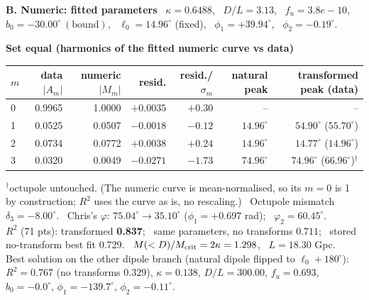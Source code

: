 \documentclass[10pt]{article}
\begin{document}
\medskip\textbf{B. Numeric: fitted parameters} \ $\kappa=0.6488$, \ $D/L=3.13$, \ $f_u=3.8e-10$, \ $b_0=-30.00^\circ\ (\text{bound})$, \ $\ell_0=14.96^\circ$ (fixed), \ $\phi_1=+39.94^\circ$, \ $\phi_2=-0.19^\circ$.

\textbf{Set equal (harmonics of the fitted numeric curve vs data)}
\begin{center}\small\begin{tabular}{lrrrrrr}\toprule
$m$ & data $|A_m|$ & numeric $|M_m|$ & resid. & resid./$\sigma_m$ & natural peak & transformed peak (data)\\\midrule
0 & 0.9965 & 1.0000 & $+0.0035$ & $+0.30$ & -- & --\\
1 & 0.0525 & 0.0507 & $-0.0018$ & $-0.12$ & $14.96^\circ$ & $54.90^\circ$ ($55.70^\circ$)\\
2 & 0.0734 & 0.0772 & $+0.0038$ & $+0.24$ & $14.96^\circ$ & $14.77^\circ$ ($14.96^\circ$)\\
3 & 0.0320 & 0.0049 & $-0.0271$ & $-1.73$ & $74.96^\circ$ & $74.96^\circ$ ($66.96^\circ$)$^\dagger$\\
\bottomrule\end{tabular}\end{center}
$^\dagger$octupole untouched. (The numeric curve is mean-normalised, so its $m{=}0$ is 1 by construction; $R^2$ uses the curve as is, no rescaling.) \ Octupole mismatch $\delta_3=-8.00^\circ$. \ Chris's $\varphi$: $75.04^\circ\to35.10^\circ$ ($\phi_1=+0.697$ rad); \ $\varphi_2=60.45^\circ$.\\
$R^2$ (71 pts): transformed \textbf{0.837}; \ same parameters, no transforms $0.711$; \ stored no-transform best fit 0.729. \ $M(<D)/M_{\rm crit}=2\kappa=1.298$, \ $L=18.30$ Gpc.
\\ Best solution on the other dipole branch (natural dipole flipped to $\ell_0+180^\circ$): $R^2=0.767$ (no transforms $0.329$), $\kappa=0.138$, $D/L=300.00$, $f_u=0.693$, $b_0=-0.0^\circ$, $\phi_1=-139.7^\circ$, $\phi_2=-0.11^\circ$.
\end{document}
